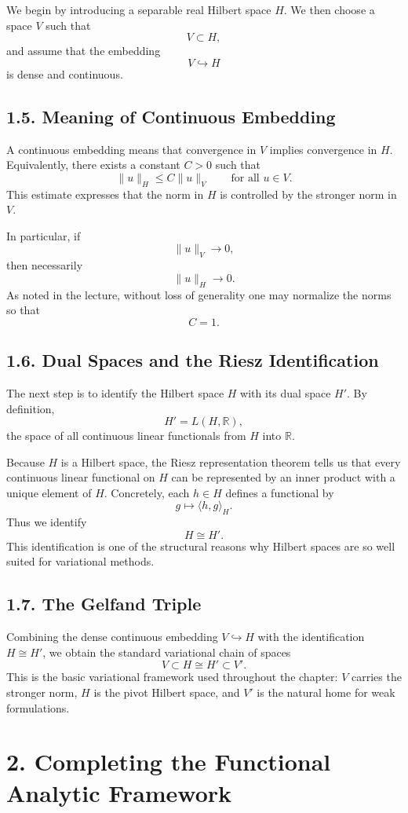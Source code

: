 \documentclass[11pt]{article}
\theoremstyle{definition}
\theoremstyle{remark}
\begin{document}
We begin by introducing a separable real Hilbert space \(H\). We then choose a space \(V\) such that
\[
V\subset H,
\]
and assume that the embedding
\[
V\hookrightarrow H
\]
is dense and continuous.

\subsection*{1.5. Meaning of Continuous Embedding}
A continuous embedding means that convergence in \(V\) implies convergence in \(H\). Equivalently, there exists a constant \(C>0\) such that
\[
\|u\|_H\le C\|u\|_V
\qquad
\text{for all } u\in V.
\]
This estimate expresses that the norm in \(H\) is controlled by the stronger norm in \(V\).

In particular, if
\[
\|u\|_V\to 0,
\]
then necessarily
\[
\|u\|_H\to 0.
\]
As noted in the lecture, without loss of generality one may normalize the norms so that
\[
C=1.
\]

\subsection*{1.6. Dual Spaces and the Riesz Identification}
The next step is to identify the Hilbert space \(H\) with its dual space \(H'\). By definition,
\[
H'=L(H,\mathbb R),
\]
the space of all continuous linear functionals from \(H\) into \(\mathbb R\).

Because \(H\) is a Hilbert space, the Riesz representation theorem tells us that every continuous linear functional on \(H\) can be represented by an inner product with a unique element of \(H\). Concretely, each \(h\in H\) defines a functional by
\[
g\mapsto \langle h,g\rangle_H.
\]
Thus we identify
\[
H\cong H'.
\]
This identification is one of the structural reasons why Hilbert spaces are so well suited for variational methods.

\subsection*{1.7. The Gelfand Triple}
Combining the dense continuous embedding \(V\hookrightarrow H\) with the identification \(H\cong H'\), we obtain the standard variational chain of spaces
\[
V\subset H\cong H'\subset V'.
\]
This is the basic variational framework used throughout the chapter: \(V\) carries the stronger norm, \(H\) is the pivot Hilbert space, and \(V'\) is the natural home for weak formulations.

\section*{2. Completing the Functional Analytic Framework}
\end{document}
